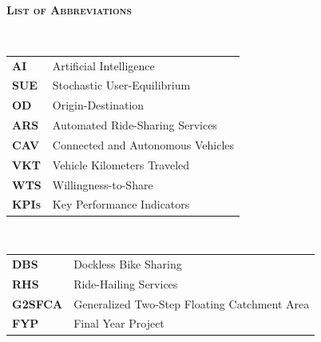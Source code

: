 \documentclass[10pt,a4paper]{report}
\begin{document}
\newpage
\textsc{\large\bfseries }\\
[1.5cm]
\textsc{\Huge\bfseries\upshape List of Abbreviations}
\setcounter{page}{3}
\vspace{2cm}\\


\vspace{0.3cm}
\begin{flushleft}
\Large\begin{tabular}{p{4cm} l}
\textsc{\bfseries AI}   & \textup{Artificial Intelligence} \\[1.9cm]
\textsc{\bfseries SUE}   & \textup{Stochastic User-Equilibrium} \\[1.9cm]
\textsc{\bfseries OD}    & \textup{Origin-Destination} \\[1.9cm]
\textsc{\bfseries ARS}   & \textup{Automated Ride-Sharing Services} \\[1.9cm]
\textsc{\bfseries CAV}   & \textup{Connected and Autonomous Vehicles} \\[1.9cm]
\textsc{\bfseries VKT}   & \textup{Vehicle Kilometers Traveled} \\[1.9cm]
\textsc{\bfseries WTS}   & \textup{Willingness-to-Share} \\[1.9cm]
\textsc{\bfseries KPIs}  & \textup{Key Performance Indicators} \\[1.9cm]

\end{tabular}
\end{flushleft}

\clearpage

 \newpage
\textsc{\large\bfseries }\\
[1.5cm]

\setcounter{page}{4}

    \vspace{0.3cm}
	\begin{flushleft} \Large \begin{tabular}{p{4cm} l}
    \textsc{\bfseries DBS}   & \textup{Dockless Bike Sharing} \\[1.9cm]
    \textsc{\bfseries RHS}   & \textup{Ride-Hailing Services} \\[1.9cm]
    \textsc{\bfseries G2SFCA} & \textup{Generalized Two-Step Floating Catchment Area} \\[1.9cm]
    \textsc{\bfseries FYP}   & \textup{Final Year Project} \\[1.9cm]
    \end{tabular} \end{flushleft}
\clearpage
\end{document}
